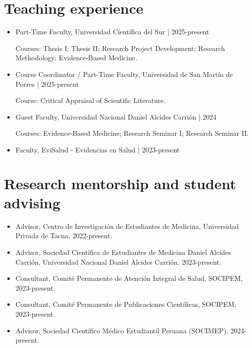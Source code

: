 \documentclass[11pt,a4paper]{article}
\begin{document}
\section*{Teaching experience}
\begin{itemize}[leftmargin=*,itemsep=4pt]
\item Part-Time Faculty, Universidad Científica del Sur | 2025-present
\par {\small Courses: Thesis I; Thesis II; Research Project Development; Research Methodology; Evidence-Based Medicine.}
\item Course Coordinator / Part-Time Faculty, Universidad de San Martín de Porres | 2025-present
\par {\small Course: Critical Appraisal of Scientific Literature.}
\item Guest Faculty, Universidad Nacional Daniel Alcides Carrión | 2024
\par {\small Courses: Evidence-Based Medicine; Research Seminar I; Research Seminar II.}
\item Faculty, EviSalud - Evidencias en Salud | 2023-present
\end{itemize}
\section*{Research mentorship and student advising}
\begin{itemize}[leftmargin=*,itemsep=4pt]
\item Advisor, Centro de Investigación de Estudiantes de Medicina, Universidad Privada de Tacna, 2022-present.
\item Advisor, Sociedad Científica de Estudiantes de Medicina Daniel Alcides Carrión, Universidad Nacional Daniel Alcides Carrión, 2023-present.
\item Consultant, Comité Permanente de Atención Integral de Salud, SOCIPEM, 2023-present.
\item Consultant, Comité Permanente de Publicaciones Científicas, SOCIPEM, 2023-present.
\item Advisor, Sociedad Científico Médico Estudiantil Peruana (SOCIMEP), 2024-present.
\end{itemize}
\end{document}
